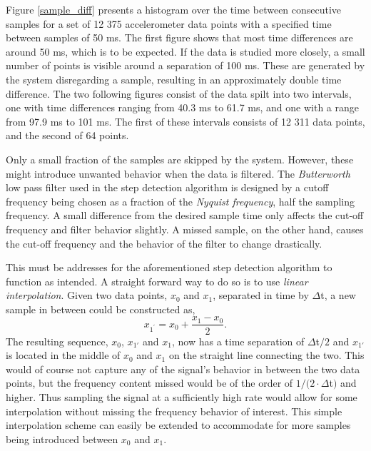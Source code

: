 \documentclass{LTHthesis}
\begin{document}
Figure \ref{sample_diff} presents a histogram over the time between consecutive samples for a set of 12 375 accelerometer data points with a specified time between samples of 50 ms. The first figure shows that most time differences are around 50 ms, which is to be expected. If the data is studied more closely, a small number of points is visible around a separation of 100 ms. These are generated by the system disregarding a sample, resulting in an approximately double time difference. The two following figures consist of the data spilt into two intervals, one with time differences ranging from 
40.3 ms to 61.7 ms, and one with a range from 97.9 ms to 101 ms. The first of these intervals consists of 12 311 data points, and the second of 64 points. 

Only a small fraction of the samples are skipped by the system. However, these might introduce unwanted behavior when the data is filtered. The \emph{Butterworth} low pass filter used in the step detection algorithm is designed by a cutoff frequency being chosen as a fraction of the \emph{Nyquist frequency}, half the sampling frequency. A small difference from the desired sample time only affects the cut-off frequency and filter behavior slightly. A missed sample, on the other hand, causes the cut-off frequency and the behavior of the filter to change drastically. 

This must be addresses for the aforementioned step detection algorithm to function as intended. A straight forward way to do so is to use \emph{linear interpolation}.  Given two data points, $x_0$ and $x_1$, separated in time by $\Delta $t, a new sample in between could be constructed as,
%
\begin{equation}
x_{1^\prime}=x_0+\frac{x_1-x_0}{2}.
\end{equation}
%
The resulting sequence, $x_0$, $x_{1'}$ and $x_1$, now has a time separation of $\Delta $t$/2$ and $x_{1'}$ is located in the middle of $x_0$ and $x_1$ on the straight line connecting the two. This would of course not capture any of the signal's behavior in between the two data points, but the frequency content missed would be of the order of $1/(2\cdot\Delta$t$)$ and higher. Thus sampling the signal at a sufficiently high rate would allow for some interpolation without missing the frequency behavior of interest. This simple interpolation scheme can easily be extended to accommodate for more samples being introduced between $x_0$ and $x_1$.
\end{document}
